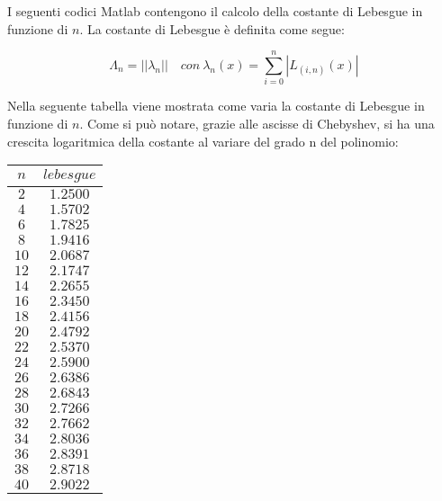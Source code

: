 \begin{center}
\large\noindent{}\end{center}

\noindent I seguenti codici Matlab contengono il calcolo della costante di Lebesgue in funzione di $n$. La costante di Lebesgue è definita come segue:

\[
\Lambda_n = ||\lambda_n|| \quad con \ \lambda_n(x) = \sum_{i=0}^{n} |L_{(i,n)}(x)|
\]




\pagebreak

\noindent Nella seguente tabella viene mostrata come varia la costante di Lebesgue in funzione di $n$. Come si può notare, grazie alle ascisse di Chebyshev, si ha una crescita logaritmica della costante al variare del grado n del polinomio: 

\begin{center}
	\begin{tabular}{|c|c|}
		\hline
		$n$ & $lebesgue$ \\
		\hline
		$2$  & $1.2500$ \\ 
		$4$  & $1.5702$ \\ 
		$6$  & $1.7825$ \\ 
		$8$  & $1.9416$ \\ 
		$10$ & $2.0687$ \\ 
		$12$ & $2.1747$ \\ 
		$14$ & $2.2655$ \\ 
		$16$ & $2.3450$ \\ 
		$18$ & $2.4156$ \\ 
		$20$ & $2.4792$ \\ 
		$22$ & $2.5370$ \\ 
		$24$ & $2.5900$ \\ 
		$26$ & $2.6386$ \\ 
		$28$ & $2.6843$ \\ 
		$30$ & $2.7266$ \\ 
		$32$ & $2.7662$ \\ 
		$34$ & $2.8036$ \\ 
		$36$ & $2.8391$ \\ 
		$38$ & $2.8718$ \\ 
		$40$ & $2.9022$ \\ 
		\hline
	\end{tabular}
\end{center} 

